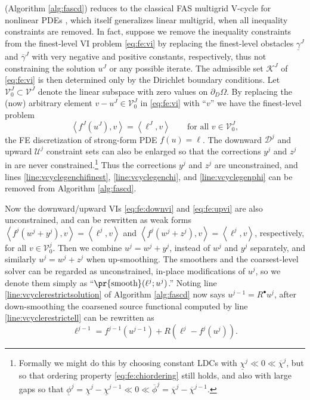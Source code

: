 \documentclass[letterpaper,final,12pt,reqno]{amsart}
\theoremstyle{cstyle}
\theoremstyle{cstyle*}
\theoremstyle{dstyle}
\numberwithin{equation}{section}
\numberwithin{figure}{section}
\numberwithin{table}{section}
\numberwithin{theorem}{section}
\newcommand{\ip}[2]{\left<#1,#2\right>}
\newcommand{\iR}{R^{\bullet}}
\begin{document}
 (Algorithm \ref{alg:fascd}) reduces to the classical FAS multigrid V-cycle for nonlinear PDEs \cite{Trottenbergetal2001}, which itself generalizes linear multigrid, when all inequality constraints are removed.  In fact, suppose we remove the inequality constraints from the finest-level VI problem \eqref{eq:fe:vi} by replacing the finest-level obstacles $\underline{\gamma}^J$ and $\overline{\gamma}^J$ with very negative and positive constants, respectively, thus not constraining the solution $u^J$ or any possible iterate.  The admissible set $\mathcal{K}^J$ of \eqref{eq:fe:vi} is then determined only by the Dirichlet boundary conditions.  Let $\mathcal{V}_0^J \subset \mathcal{V}^J$ denote the linear subspace with zero values on $\partial_D\Omega$.  By replacing the (now) arbitrary element $v-u^J\in\mathcal{V}_0^J$ in \eqref{eq:fe:vi} with ``$v$'' we have the finest-level problem
\begin{equation}
\ip{f^J(u^J)}{v} = \ip{\ell^J}{v} \qquad \text{for all } v\in \mathcal{V}_0^J, \label{eq:app:fas:pde}
\end{equation}
the FE discretization of strong-form PDE $f(u)=\ell$.  The downward $\mathcal{D}^j$ and upward $\mathcal{U}^j$ constraint sets can also be enlarged so that the corrections $y^j$ and $z^j$ in  are never constrained.\footnote{Formally we might do this by choosing constant LDCs with $\underline{\chi}^j \ll 0 \ll \overline{\chi}^j$, but so that ordering property \eqref{eq:fe:chiordering} still holds, and also with large gaps so that $\underline{\phi}^j = \underline{\chi}^j - \underline{\chi}^{j-1} \ll 0 \ll \overline{\phi}^j = \overline{\chi}^j - \overline{\chi}^{j-1}$.}  Thus the corrections $y^j$ and $z^j$ are unconstrained, and lines \ref{line:vcyclegenchifinest}, \ref{line:vcyclegenchi}, and \ref{line:vcyclegenphi} can be removed from Algorithm \ref{alg:fascd}.

Now the downward/upward VIs \eqref{eq:fe:downvi} and \eqref{eq:fe:upvi} are also unconstrained, and can be rewritten as weak forms $\ip{f^j(w^j + y^j)}{v} = \ip{\ell^j}{v}$ and $\ip{f^j(w^j + z^j)}{v} = \ip{\ell^j}{v}$, respectively, for all $v\in \mathcal{V}_0^j$.  Then we combine $u^j=w^j+y^j$, instead of $w^j$ and $y^j$ separately, and similarly $u^j=w^j+z^j$ when up-smoothing.  The smoothers and the coarsest-level solver can be regarded as unconstrained, in-place modifications of $u^j$, so we denote them simply as ``$\text{\pr{smooth}}(\ell^j;u^j)$.''  Noting line \ref{line:vcyclerestrictsolution} of Algorithm \ref{alg:fascd} now says $u^{j-1}=\iR u^j$, after down-smoothing the coarsened source functional computed by line \ref{line:vcyclerestrictell} can be rewritten as
\begin{equation}
\ell^{j-1} = f^{j-1}\left(u^{j-1}\right) + R\left(\ell^j-f^j(u^j)\right). \label{eq:app:fas:levelsource}
\end{equation}
\end{document}
